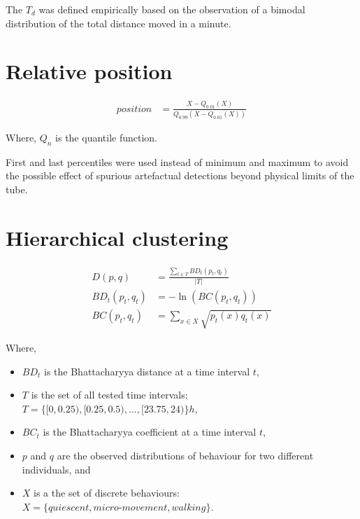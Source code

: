 \documentclass[a4paper,twoside,openright]{article}
\begin{document}
The $T_d$ was defined empirically based on the observation of a bimodal distribution of the total distance moved in a minute.


\section*{Relative position}

\begin{align}
position &=  \frac{X - Q_{0.01}(X)}{Q_{0.99}(X - Q_{0.01}(X))}
\end{align}

Where, $Q_n$ is the quantile function.

First and last percentiles were used instead of minimum and maximum to avoid the possible effect of spurious artefactual detections beyond physical limits of the tube.



\section*{Hierarchical clustering}

\begin{align}
D(p,q) &=  \frac{\sum_{t \in T}{BD_t(p_t,q_t)}}{|T|} \\
BD_t(p_t,q_t) &= -\ln (BC(p_t,q_t))\\
BC(p_t,q_t) &= \sum_{x\in X} \sqrt{p_t(x) q_t(x)}
\end{align}


Where,
\begin{itemize}
\item $BD_t$ is the Bhattacharyya distance at a time interval $t$,
\item $T$ is the set of all tested time intervals: $T=\{[0, 0.25), [0.25,0.5), ..., [23.75, 24)\} h$,
\item $BC_t$ is the Bhattacharyya coefficient at a time interval $t$,
\item $p$ and $q$ are the observed distributions of behaviour for two different individuals, and
\item $X$ is a the set of discrete behaviours: $X = \{quiescent, micro\text{-}movement, walking\}$.
\end{itemize}
\end{document}
